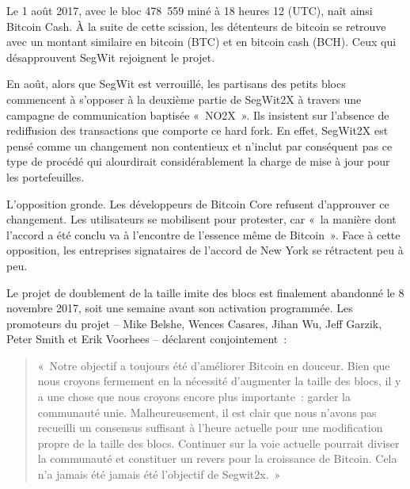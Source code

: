 Le 1\ier{} août 2017, avec le bloc 478~559 miné à 18 heures 12 (UTC), naît ainsi Bitcoin Cash. À la suite de cette scission, les détenteurs de bitcoin se retrouve avec un montant similaire en bitcoin (BTC) et en bitcoin cash (BCH). Ceux qui désapprouvent SegWit rejoignent le projet. 

En août, alors que SegWit est verrouillé, les partisans des petits blocs commencent à s'opposer à la deuxième partie de SegWit2X à travers une campagne de communication baptisée «~NO2X~». Ils insistent sur l'absence de rediffusion des transactions que comporte ce hard fork. En effet, SegWit2X est pensé comme un changement non contentieux et n'inclut par conséquent pas ce type de procédé qui alourdirait considérablement la charge de mise à jour pour les portefeuilles.

L'opposition gronde. Les développeurs de Bitcoin Core refusent d'approuver ce changement. Les utilisateurs se mobilisent pour protester, car «~la manière dont l'accord a été conclu va à l'encontre de l'essence même de Bitcoin~». Face à cette opposition, les entreprises signataires de l'accord de New York se rétractent peu à peu.

Le projet de doublement de la taille imite des blocs est finalement abandonné le 8 novembre 2017, soit une semaine avant son activation programmée. Les promoteurs du projet -- Mike Belshe, Wences Casares, Jihan Wu, Jeff Garzik, Peter Smith et Erik Voorhees -- déclarent conjointement~:

\begin{quote}
«~Notre objectif a toujours été d'améliorer Bitcoin en douceur. Bien que nous croyons fermement en la nécessité d'augmenter la taille des blocs, il y a une chose que nous croyons encore plus importante~: garder la communauté unie. Malheureusement, il est clair que nous n'avons pas recueilli un consensus suffisant à l'heure actuelle pour une modification propre de la taille des blocs. Continuer sur la voie actuelle pourrait diviser la communauté et constituer un revers pour la croissance de Bitcoin. Cela n'a jamais été jamais été l'objectif de Segwit2x.~»
\end{quote}


